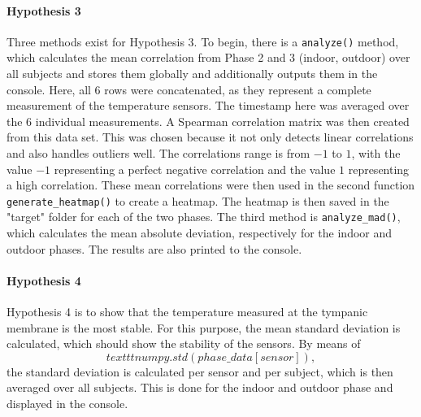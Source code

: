 \paragraph{Hypothesis 3}
Three methods exist for Hypothesis 3.
To begin, there is a \texttt{analyze()} method, which calculates the mean correlation from Phase 2 and 3 (indoor, outdoor) over all subjects and stores them globally and additionally outputs them in the console.
Here, all 6 rows were concatenated, as they represent a complete measurement of the temperature sensors. 
The timestamp here was averaged over the 6 individual measurements.
A Spearman correlation matrix was then created from this data set. 
This was chosen because it not only detects linear correlations and also handles outliers well.
The correlations range is from $-1$ to $1$, with the value $-1$ representing a perfect negative correlation and the value $1$ representing a high correlation.
These mean correlations were then used in the second function \texttt{generate\_heatmap()} to create a heatmap. 
The heatmap is then saved in the "target" folder for each of the two phases.
The third method is \texttt{analyze\_mad()}, which calculates the mean absolute deviation, respectively for the indoor and outdoor phases.
The results are also printed to the console.

\paragraph{Hypothesis 4}
Hypothesis 4 is to show that the temperature measured at the tympanic membrane is the most stable. 
For this purpose, the mean standard deviation is calculated, which should show the stability of the sensors. 
By means of 
\[
texttt{numpy.std(phase\_data[sensor])},
\]
the standard deviation is calculated per sensor and per subject, which is then averaged over all subjects.
This is done for the indoor and outdoor phase and displayed in the console.

